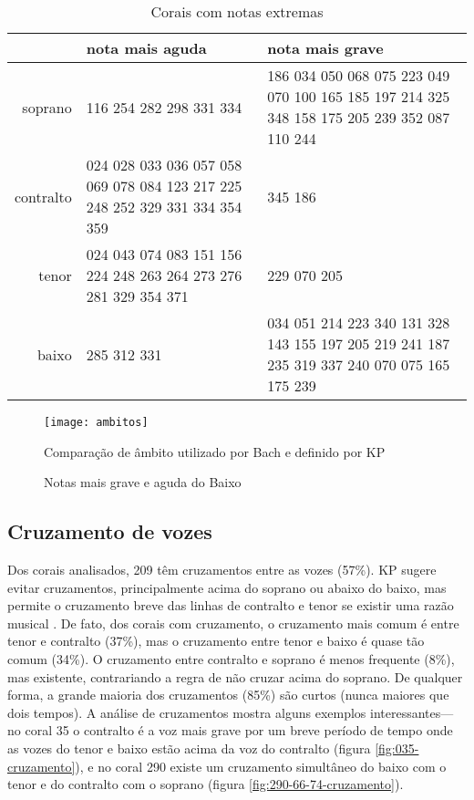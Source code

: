\begin{table}
\begin{center}
\begin{small}
\begin{sc}
  \begin{tabular}{r|p{4cm}p{4cm}}
    & nota mais aguda & nota mais grave \\ 
    \hline
    soprano &  116 254 282 298 331 334 &  186 034 050 068 075 223 049 070 100 165 185 197 214 325 348 158 175
    205 239 352 087 110 244 \\ \aroundspace
    contralto & 024 028 033 036 057 058 069 078 084 123 217 225 248 252 329 331 334
    354 359 &   345 186 \\ \aroundspace
    tenor &   024 043 074 083 151 156 224 248 263 264 273 276 281 329
    354 371 &   229 070 205 \\ \aroundspace
    baixo &   285 312 331 &   034 051 214 223 340 131 328 143 155 197 205 219 241 187 235 319 337
    240 070 075 165 175 239 
  \end{tabular}
  \caption{Corais com notas extremas}
  \label{tab:notas-extremas}
\end{sc}
\end{small}
\end{center}
\end{table}

\begin{figure}[!h]
  \centering
  \texttt{[image: ambitos]}
  \caption{Comparação de âmbito utilizado por Bach e definido por KP}
  \label{fig:ambito-kostka}
\end{figure}

\begin{figure}[!h]
  \centering
  \caption{Notas mais grave e aguda do Baixo}
  \label{fig:ambitos-alem}
\end{figure}

\subsection{Cruzamento de vozes}
\label{sec:cruzamento-de-vozes}

Dos corais analisados, 209 têm cruzamentos entre as vozes (57\%). KP
sugere evitar cruzamentos, principalmente acima do soprano ou abaixo
do baixo, mas permite o cruzamento breve das linhas de contralto e
tenor se existir uma razão musical \cite[p. 79]{kostka.ea00:tonal}. De
fato, dos corais com cruzamento, o cruzamento mais comum é entre tenor
e contralto (37\%), mas o cruzamento entre tenor e baixo é quase tão
comum (34\%). O cruzamento entre contralto e soprano é menos frequente
(8\%), mas existente, contrariando a regra de não cruzar acima do
soprano. De qualquer forma, a grande maioria dos cruzamentos (85\%)
são curtos (nunca maiores que dois tempos). A análise de cruzamentos
mostra alguns exemplos interessantes---no coral 35 o contralto é a voz
mais grave por um breve período de tempo onde as vozes do tenor e
baixo estão acima da voz do contralto (figura
\ref{fig:035-cruzamento}), e no coral 290 existe um cruzamento
simultâneo do baixo com o tenor e do contralto com o soprano (figura
\ref{fig:290-66-74-cruzamento}).

